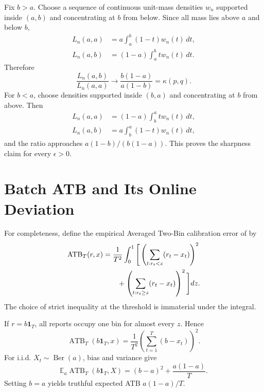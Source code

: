 \documentclass[twoside]{article}
\newcommand{\E}{\mathbb E}
\newcommand{\1}{\mathbf 1}
\begin{document}
Fix $b>a$. Choose a sequence of continuous unit-mass densities $w_n$
supported inside $(a,b)$ and concentrating at $b$ from below. Since all mass
lies above $a$ and below $b$,
\begin{align*}
 L_n(a,a)&=a\int_a^b(1-t)w_n(t)\,dt,\\
 L_n(a,b)&=(1-a)\int_a^b t w_n(t)\,dt.
\end{align*}
Therefore
\begin{equation*}
 \frac{L_n(a,b)}{L_n(a,a)}
 \longrightarrow\frac{b(1-a)}{a(1-b)}=\kappa(p,q).
\end{equation*}
For $b<a$, choose densities supported inside $(b,a)$ and concentrating at
$b$ from above. Then
\begin{align*}
 L_n(a,a)&=(1-a)\int_b^a t w_n(t)\,dt,\\
 L_n(a,b)&=a\int_b^a(1-t)w_n(t)\,dt,
\end{align*}
and the ratio approaches $a(1-b)/(b(1-a))$. This proves the sharpness claim
for every $\epsilon>0$.

\section{Batch ATB and Its Online Deviation}
\label{app:atb}

For completeness, define the empirical Averaged Two-Bin calibration error
of \citet{hartline2026perfect} by
\begin{align}
 \operatorname{ATB}_T(r,x)
 &=\frac{1}{T^2}\int_0^1\Bigg[
 \left(\sum_{t:r_t<z}(r_t-x_t)\right)^2\notag\\
 &\qquad+
 \left(\sum_{t:r_t\geq z}(r_t-x_t)\right)^2\Bigg]dz.
 \label{eq:supp-atb}
\end{align}
The choice of strict inequality at the threshold is immaterial under the
integral.

If $r=b\1_T$, all reports occupy one bin for almost every $z$. Hence
\begin{equation*}
 \operatorname{ATB}_T(b\1_T,x)
 =\frac{1}{T^2}\left(\sum_{t=1}^T(b-x_t)\right)^2.
\end{equation*}
For i.i.d. $X_t\sim\operatorname{Ber}(a)$, bias and variance give
\begin{equation}
 \E_a\operatorname{ATB}_T(b\1_T,X)
 =(b-a)^2+\frac{a(1-a)}{T}.
 \label{eq:supp-atb-expectation}
\end{equation}
Setting $b=a$ yields truthful expected ATB $a(1-a)/T$.
\end{document}
